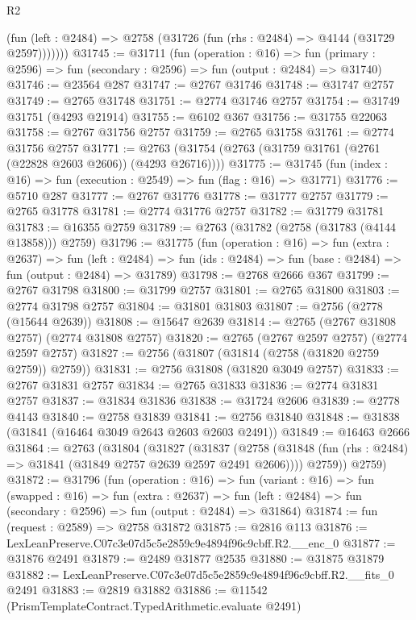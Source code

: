 \begin{lexlean}{R2}
\begin{coremodule}
          (fun (left : @2484) => @2758 (@31726 (fun (rhs : @2484) => @4144 (@31729 @2597)))))))
@31745 := @31711
    (fun (operation : @16) =>
    fun (primary : @2596) => fun (secondary : @2596) => fun (output : @2484) => @31740)
@31746 := @23564 @287
@31747 := @2767 @31746
@31748 := @31747 @2757
@31749 := @2765 @31748
@31751 := @2774 @31746 @2757
@31754 := @31749 @31751 (@4293 @21914)
@31755 := @6102 @367
@31756 := @31755 @22063
@31758 := @2767 @31756 @2757
@31759 := @2765 @31758
@31761 := @2774 @31756 @2757
@31771 := @2763 (@31754 (@2763 (@31759 @31761 (@2761 (@22828 @2603 @2606)) (@4293 @26716))))
@31775 := @31745 (fun (index : @16) => fun (execution : @2549) => fun (flag : @16) => @31771)
@31776 := @5710 @287
@31777 := @2767 @31776
@31778 := @31777 @2757
@31779 := @2765 @31778
@31781 := @2774 @31776 @2757
@31782 := @31779 @31781
@31783 := @16355 @2759
@31789 := @2763 (@31782 (@2758 (@31783 (@4144 @13858))) @2759)
@31796 := @31775
    (fun (operation : @16) =>
    fun (extra : @2637) =>
    fun (left : @2484) => fun (ids : @2484) => fun (base : @2484) => fun (output : @2484) => @31789)
@31798 := @2768 @2666 @367
@31799 := @2767 @31798
@31800 := @31799 @2757
@31801 := @2765 @31800
@31803 := @2774 @31798 @2757
@31804 := @31801 @31803
@31807 := @2756 (@2778 (@15644 @2639))
@31808 := @15647 @2639
@31814 := @2765 (@2767 @31808 @2757) (@2774 @31808 @2757)
@31820 := @2765 (@2767 @2597 @2757) (@2774 @2597 @2757)
@31827 := @2756 (@31807 (@31814 (@2758 (@31820 @2759 @2759)) @2759))
@31831 := @2756 @31808 (@31820 @3049 @2757)
@31833 := @2767 @31831 @2757
@31834 := @2765 @31833
@31836 := @2774 @31831 @2757
@31837 := @31834 @31836
@31838 := @31724 @2606
@31839 := @2778 @4143
@31840 := @2758 @31839
@31841 := @2756 @31840
@31848 := @31838 (@31841 (@16464 @3049 @2643 @2603 @2603 @2491))
@31849 := @16463 @2666
@31864 := @2763
    (@31804
      (@31827
        (@31837
          (@2758 (@31848 (fun (rhs : @2484) => @31841 (@31849 @2757 @2639 @2597 @2491 @2606))))
          @2759))
      @2759)
@31872 := @31796
    (fun (operation : @16) =>
    fun (variant : @16) =>
    fun (swapped : @16) =>
    fun (extra : @2637) =>
    fun (left : @2484) => fun (secondary : @2596) => fun (output : @2484) => @31864)
@31874 := fun (request : @2589) => @2758 @31872
@31875 := @2816 @113
@31876 := LexLeanPreserve.C07c3e07d5c5e2859c9e4894f96c9cbff.R2.__enc_0
@31877 := @31876 @2491
@31879 := @2489 @31877 @2535
@31880 := @31875 @31879
@31882 := LexLeanPreserve.C07c3e07d5c5e2859c9e4894f96c9cbff.R2.__fits_0 @2491
@31883 := @2819 @31882
@31886 := @11542 (PrismTemplateContract.TypedArithmetic.evaluate @2491)

\end{coremodule}
\end{lexlean}
